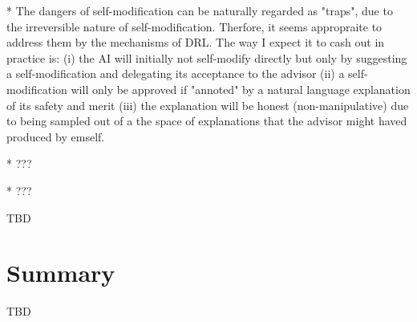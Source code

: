 \documentclass[a4paper]{article}
\begin{document}
* The dangers of self-modification can be naturally regarded as "traps", due to the irreversible nature of self-modification. Therfore, it seems appropraite to address them by the mechanisms of DRL. The way I expect it to cash out in practice is: (i) the AI will initially not self-modify directly but only by suggesting a self-modification and delegating its acceptance to the advisor (ii) a self-modification will only be approved if "annoted" by a natural language explanation of its safety and merit (iii) the explanation will be honest (non-manipulative) due to being sampled out of a the space of explanations that the advisor might haved produced by emself.

* ??? %

* ??? %

TBD

\section{Summary}


TBD
\end{document}
